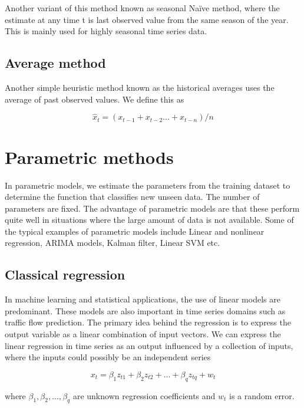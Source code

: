 Another variant of this method known as seasonal Naïve method, where the estimate at any time t is
last observed value from the same season of the year. This is mainly used for highly seasonal time
series data.

\subsection{Average method}
Another simple heuristic method known as the historical averages uses the average of past observed
values. We define this as

        \begin{equation}
            \hat{x}_{t} = (x_{t-1} + x_{t-2} ... + x_{t-n})/n
        \end{equation}

\section{Parametric methods}
In parametric models, we estimate the parameters from the training dataset to determine the
function that classifies new unseen data. The number of parameters are fixed. The advantage of
parametric models are that these perform quite well in situations where the large amount of data
is not available. Some of the typical examples of parametric models include Linear and
nonlinear regression, ARIMA models, Kalman filter, Linear SVM etc.

\subsection{Classical regression}
In machine learning and statistical applications, the use of linear models are predominant. These
models are also important in time series domains such as traffic flow prediction. The primary
idea behind the regression is to express the output variable as a linear combination of input
vectors. We can express the linear regression in time series as an output influenced by a
collection of inputs, where the inputs could possibly be an independent series

        \begin{equation}
            x_{t} = \beta_{1}z_{t1} + \beta_{2}z_{t2} + ... + \beta_{q}z_{tq} + w_{t}
        \end{equation}

where $ \beta_{1}, \beta_{2},...,\beta_{q} $ are unknown regression coefficients and $w_{t}$ is
a random error.

